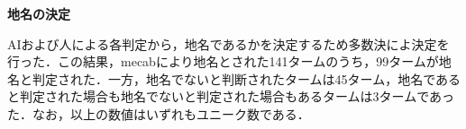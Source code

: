 \textbf{地名の決定}

AIおよび人による各判定から，地名であるかを決定するため多数決によ決定を行った．この結果，mecabにより地名とされた141タームのうち，99タームが地名と判定された．一方，地名でないと判断されたタームは45ターム，地名であると判定された場合も地名でないと判定された場合もあるタームは3タームであった．なお，以上の数値はいずれもユニーク数である．
